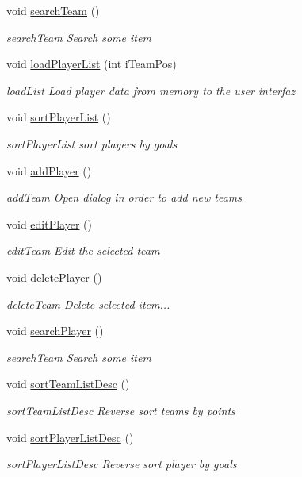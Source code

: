 \begin{DoxyCompactItemize}
void \hyperlink{class_main_window_a963edb5b19f8d39b0c5bbacc0d9ed5d6}{search\+Team} ()
\begin{DoxyCompactList}\small\item\em search\+Team Search some item \end{DoxyCompactList}\item 
void \hyperlink{class_main_window_a97f65a18f84465f9847581dde1b2d54a}{load\+Player\+List} (int i\+Team\+Pos)
\begin{DoxyCompactList}\small\item\em load\+List Load player data from memory to the user interfaz \end{DoxyCompactList}\item 
void \hyperlink{class_main_window_ac39f495a110346fa8f5aa152ea92c06d}{sort\+Player\+List} ()
\begin{DoxyCompactList}\small\item\em sort\+Player\+List sort players by goals \end{DoxyCompactList}\item 
void \hyperlink{class_main_window_a7595d83dc20e47d973ccd7b6344367bb}{add\+Player} ()
\begin{DoxyCompactList}\small\item\em add\+Team Open dialog in order to add new teams \end{DoxyCompactList}\item 
void \hyperlink{class_main_window_a22c2cf54c567c2de6ec7bd6f7c79ced8}{edit\+Player} ()
\begin{DoxyCompactList}\small\item\em edit\+Team Edit the selected team \end{DoxyCompactList}\item 
void \hyperlink{class_main_window_a760726cc3c6019db7f8f58648686b03c}{delete\+Player} ()
\begin{DoxyCompactList}\small\item\em delete\+Team Delete selected item... \end{DoxyCompactList}\item 
void \hyperlink{class_main_window_ac529c585e84254f8ea1493aa4e984fff}{search\+Player} ()
\begin{DoxyCompactList}\small\item\em search\+Team Search some item \end{DoxyCompactList}\item 
void \hyperlink{class_main_window_a8e71f51c64a9d0f27b0c7547604357be}{sort\+Team\+List\+Desc} ()
\begin{DoxyCompactList}\small\item\em sort\+Team\+List\+Desc Reverse sort teams by points \end{DoxyCompactList}\item 
void \hyperlink{class_main_window_a3c3289fb0c25eb584d7041cd3ddccd43}{sort\+Player\+List\+Desc} ()
\begin{DoxyCompactList}\small\item\em sort\+Player\+List\+Desc Reverse sort player by goals \end{DoxyCompactList}\end{DoxyCompactItemize}
